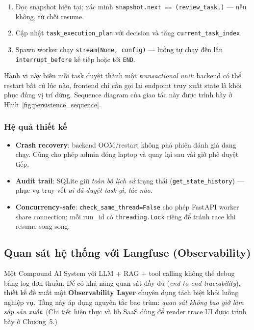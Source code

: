 \begin{enumerate}
  \item Đọc snapshot hiện tại; xác minh \texttt{snapshot.next == (review\_task,)} — nếu không, từ chối resume.
  \item Cập nhật \texttt{task\_execution\_plan} với decision và tăng \texttt{current\_task\_index}.
  \item Spawn worker chạy \texttt{stream(None, config)} — luồng tự chạy đến lần \texttt{interrupt\_before} kế tiếp hoặc tới \texttt{END}.
\end{enumerate}

Hành vi này biến mỗi task duyệt thành một \textit{transactional unit}: backend có thể restart bất cứ lúc nào, frontend chỉ cần gọi lại endpoint truy xuất state là khôi phục đúng vị trí dừng. Sequence diagram của giao tác này được trình bày ở Hình~\ref{fig:persistence_sequence}.



\subsubsection*{Hệ quả thiết kế}
\begin{itemize}
  \item \textbf{Crash recovery}: backend OOM/restart không phá phiên đánh giá đang chạy. Cũng cho phép admin đóng laptop và quay lại sau vài giờ phê duyệt tiếp.
  \item \textbf{Audit trail}: SQLite giữ \textit{toàn bộ lịch sử} trạng thái (\texttt{get\_state\_history}) — phục vụ truy vết \textit{ai đã duyệt task gì, lúc nào}.
  \item \textbf{Concurrency-safe}: \texttt{check\_same\_thread=False} cho phép FastAPI worker share connection; mỗi run\_id có \texttt{threading.Lock} riêng để tránh race khi resume song song.
\end{itemize}

\subsection{Quan sát hệ thống với Langfuse (Observability)}
\label{subsec:observability_langfuse}

Một Compound AI System với LLM + RAG + tool calling không thể debug bằng log đơn thuần. Để có khả năng quan sát đầy đủ (\textit{end-to-end traceability}), thiết kế đề xuất một \textbf{Observability Layer} chuyên dụng tách biệt khỏi luồng nghiệp vụ. Tầng này áp dụng nguyên tắc bao trùm: \textit{quan sát không bao giờ làm sập sản xuất}. (Chi tiết hiện thực và lib SaaS dùng để render trace UI được trình bày ở Chương~5.)

